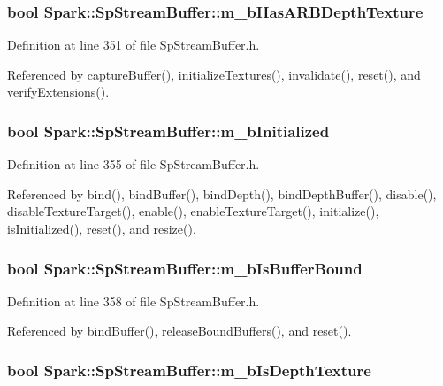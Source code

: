 \subsubsection{\setlength{\rightskip}{0pt plus 5cm}bool {\bf Spark::Sp\-Stream\-Buffer::m\_\-b\-Has\-ARBDepth\-Texture}\hspace{0.3cm}{\tt  [protected]}}\label{classSpark_1_1SpStreamBuffer_p4}


Definition at line 351 of file Sp\-Stream\-Buffer.h.

Referenced by capture\-Buffer(), initialize\-Textures(), invalidate(), reset(), and verify\-Extensions().
\subsubsection{\setlength{\rightskip}{0pt plus 5cm}bool {\bf Spark::Sp\-Stream\-Buffer::m\_\-b\-Initialized}\hspace{0.3cm}{\tt  [protected]}}\label{classSpark_1_1SpStreamBuffer_p6}


Definition at line 355 of file Sp\-Stream\-Buffer.h.

Referenced by bind(), bind\-Buffer(), bind\-Depth(), bind\-Depth\-Buffer(), disable(), disable\-Texture\-Target(), enable(), enable\-Texture\-Target(), initialize(), is\-Initialized(), reset(), and resize().
\subsubsection{\setlength{\rightskip}{0pt plus 5cm}bool {\bf Spark::Sp\-Stream\-Buffer::m\_\-b\-Is\-Buffer\-Bound}\hspace{0.3cm}{\tt  [protected]}}\label{classSpark_1_1SpStreamBuffer_p8}


Definition at line 358 of file Sp\-Stream\-Buffer.h.

Referenced by bind\-Buffer(), release\-Bound\-Buffers(), and reset().
\subsubsection{\setlength{\rightskip}{0pt plus 5cm}bool {\bf Spark::Sp\-Stream\-Buffer::m\_\-b\-Is\-Depth\-Texture}\hspace{0.3cm}{\tt  [protected]}}\label{classSpark_1_1SpStreamBuffer_p3}


